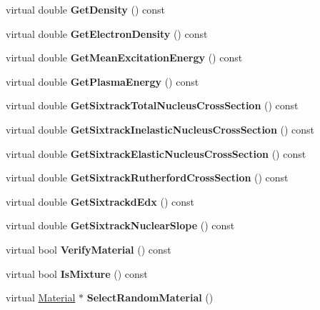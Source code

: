 \begin{DoxyCompactItemize}
\item 
\mbox{\label{classMaterial_a7aa071d8e1cee56eea1ddbc7fd5ff300}} 
virtual double {\bfseries Get\+Density} () const
\item 
\mbox{\label{classMaterial_a547f866bf5ea40e02eeeb1ee166c0f15}} 
virtual double {\bfseries Get\+Electron\+Density} () const
\item 
\mbox{\label{classMaterial_aaf0356189f6b4a7050b2d6045b287743}} 
virtual double {\bfseries Get\+Mean\+Excitation\+Energy} () const
\item 
\mbox{\label{classMaterial_a5e98d2a2b7451fd0d6d60dab4a7525c9}} 
virtual double {\bfseries Get\+Plasma\+Energy} () const
\item 
\mbox{\label{classMaterial_a211db3f0b4d95c4437bcede759945cb1}} 
virtual double {\bfseries Get\+Sixtrack\+Total\+Nucleus\+Cross\+Section} () const
\item 
\mbox{\label{classMaterial_a8d2f1bb326cb6f2ac76ac5878fc00425}} 
virtual double {\bfseries Get\+Sixtrack\+Inelastic\+Nucleus\+Cross\+Section} () const
\item 
\mbox{\label{classMaterial_aba642597537094b5b01ff4a9af9132a0}} 
virtual double {\bfseries Get\+Sixtrack\+Elastic\+Nucleus\+Cross\+Section} () const
\item 
\mbox{\label{classMaterial_a9b08c08e4659a993fc38229a71fc7736}} 
virtual double {\bfseries Get\+Sixtrack\+Rutherford\+Cross\+Section} () const
\item 
\mbox{\label{classMaterial_a973c5bbd6ab046924c4261152625e4aa}} 
virtual double {\bfseries Get\+Sixtrackd\+Edx} () const
\item 
\mbox{\label{classMaterial_a23cb3dd182fed5a88e7f393c305edc02}} 
virtual double {\bfseries Get\+Sixtrack\+Nuclear\+Slope} () const
\item 
\mbox{\label{classMaterial_a8dc92a19ec9f2929a43787d809840112}} 
virtual bool {\bfseries Verify\+Material} () const
\item 
\mbox{\label{classMaterial_a63b277df30b8b29c9c4d4154a769f485}} 
virtual bool {\bfseries Is\+Mixture} () const
\item 
\mbox{\label{classMaterial_ab4c5804c4bd4215405e1d7ae2c03d538}} 
virtual \hyperlink{classMaterial}{Material} $\ast$ {\bfseries Select\+Random\+Material} ()
\end{DoxyCompactItemize}
